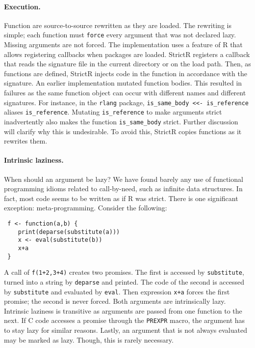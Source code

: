 \documentclass[review,creen,acmsmall]{acmart}
\newcommand{\code}[1]{\lstinline |#1|\xspace}
\renewcommand{\c}[1]{\lstinline |#1|\xspace}
\newcommand{\strictr}{{\sf StrictR}\xspace}
\begin{document}
\paragraph{Execution.}
Function are source-to-source rewritten as they are loaded. The rewriting is
simple; each function must \c{force} every argument that was not declared lazy.
Missing arguments are not forced. The implementation uses a feature of R that
allows registering callbacks when packages are loaded. \strictr registers a
callback that reads the signature file in the current directory or on the load
path. Then, as functions are defined, \strictr injects code in the function in
accordance with the signature. An earlier implementation mutated function
bodies. This resulted in failures as the same function object can occur with
different names and different signatures. For instance, in the \code{rlang}
package, \code{is_same_body <<- is_reference} aliases \code{is_reference}.
Mutating \code{is_reference} to make arguments strict inadvertently also makes
the function \code{is_same_body} strict. Further discussion will clarify why
this is undesirable. To avoid this, \strictr copies functions as it rewrites
them.

\paragraph{Intrinsic laziness.} When should an  argument be lazy?
We have found barely any use of functional programming idioms related to
call-by-need, such as infinite data structures. In fact, most code seems to be
written as if R was strict. There is one significant exception:
meta-programming. Consider the following:
\begin{lstlisting}
 f <- function(a,b) {
    print(deparse(substitute(a)))
    x <- eval(substitute(b))
    x+a
 }
\end{lstlisting}

\medskip
\noindent
A call of \c{f(1+2,3+4)} creates two promises. The first is accessed by
\c{substitute}, turned into a string by \c{deparse} and printed. The code of the
second is accessed by \c{substitute} and evaluated by \c{eval}. Then expression
\c{x+a} forces the first promise; the second is never forced. Both arguments are
intrinsically lazy. Intrinsic laziness is transitive as arguments are passed
from one function to the next. If C code accesses a promise through the
\code{PREXPR} macro, the argument has to stay lazy for similar reasons. Lastly,
an argument that is not always evaluated may be marked as lazy. Though, this
is rarely necessary.
\end{document}
